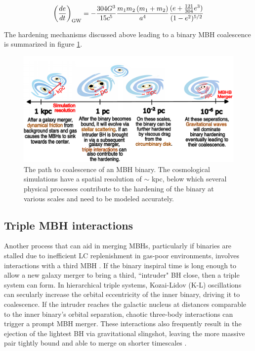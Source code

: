 \documentclass[11pt, letterpaper]{article}
\begin{document}
\begin{equation}
    \left(\frac{d e}{dt}\right)_{\rm GW}=-\frac{304G^3}{15c^5} \frac{m_1 m_2 \left	(m_1 +m_2\right)}{a^4} \frac{(e+ \frac{121}{304}e^3)}
 {(1-e^2)^{5/2}}
 \label{dedt_gw}
\end{equation}

The hardening mechanisms discussed above leading to a binary MBH coalescence is summarized in figure \ref{fig:path-to-merger}.

\begin{figure}[!htb]
    \centering
    \includegraphics[width=0.9\linewidth]{fig/finesst_1st_fig.pdf}
    \caption{The path to coalescence of an MBH binary. The cosmological simulations have a spatial resolution of $\sim$
kpc, below which several physical processes contribute to the hardening of the binary at various scales and need to be
modeled accurately.}
    \label{fig:path-to-merger}
\end{figure}




\subsection{Triple MBH interactions}
\label{sec: triple-interactions}

Another process that can aid in merging MBHs, particularly if binaries are stalled due to inefficient LC replenishment in gas-poor
environments, involves interactions with a third MBH \citep[e.g.,][]{hoffman_dynamics_2007,ryu_interactions_2017,bonetti_post-newtonian_2018-1}. If the binary inspiral time is long enough to allow a new galaxy merger to bring a third, ``intruder" BH close, then a triple system can form. In hierarchical triple systems, Kozai-Lidov (K-L) oscillations \citep{Kozai1962,Lidov1962,Naoz_2016} can secularly increase the orbital eccentricity of the inner binary, driving it to coalescence. If the intruder reaches the galactic nucleus at distances comparable to the inner binary’s orbital separation, chaotic three-body interactions can trigger a prompt MBH merger. These interactions also frequently result in the ejection of the lightest BH via gravitational slingshot, leaving the more massive pair tightly bound and able to merge on shorter timescales \citep{saslaw_gravitational_1974,hills_encounters_1975,blaes_kozai_2002,iwasawa_evolution_2006,hoffman_dynamics_2007}.
\end{document}
